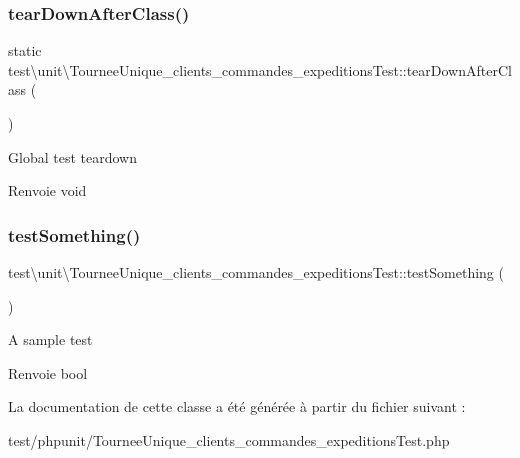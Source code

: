 \subsubsection{\texorpdfstring{tear\+Down\+After\+Class()}{tearDownAfterClass()}}
{\footnotesize\ttfamily static test\textbackslash{}unit\textbackslash{}\+Tournee\+Unique\+\_\+clients\+\_\+commandes\+\_\+expeditions\+Test\+::tear\+Down\+After\+Class (\begin{DoxyParamCaption}{ }\end{DoxyParamCaption})\hspace{0.3cm}{\ttfamily [static]}}

Global test teardown \begin{DoxyReturn}{Renvoie}
void 
\end{DoxyReturn}
\mbox{\label{classtest_1_1unit_1_1TourneeUnique__clients__commandes__expeditionsTest_a3387dc9e3f5c053b5e474e366cb4556a}} 
\subsubsection{\texorpdfstring{test\+Something()}{testSomething()}}
{\footnotesize\ttfamily test\textbackslash{}unit\textbackslash{}\+Tournee\+Unique\+\_\+clients\+\_\+commandes\+\_\+expeditions\+Test\+::test\+Something (\begin{DoxyParamCaption}{ }\end{DoxyParamCaption})}

A sample test \begin{DoxyReturn}{Renvoie}
bool 
\end{DoxyReturn}


La documentation de cette classe a été générée à partir du fichier suivant \+:\begin{DoxyCompactItemize}
\item 
test/phpunit/Tournee\+Unique\+\_\+clients\+\_\+commandes\+\_\+expeditions\+Test.\+php\end{DoxyCompactItemize}
